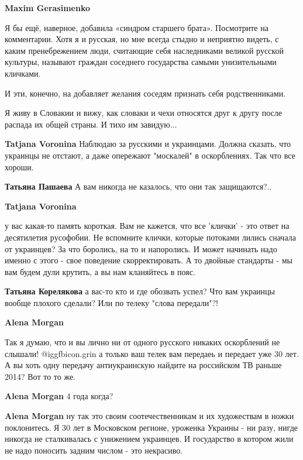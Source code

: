 \begin{itemize}
\begin{itemize}
\textbf{Maxim Gerasimenko}

Я бы ещё, наверное, добавила «синдром старшего брата». Посмотрите на
комментарии. Хотя я и русская, но мне всегда стыдно и неприятно видеть, с каким
пренебрежением люди, считающие себя наследниками великой русской культуры,
называют граждан соседнего государства самыми унизительными кличками.

И эти, конечно, на добавляет желания соседям признать себя родственниками.

Я живу в Словакии и вижу, как словаки и чехи относятся друг к другу после
распада их общей страны. И тихо им завидую...


\textbf{Tatjana Voronina} Наблюдаю за русскими и украинцами. Должна сказать, что украинцы не отстают, а даже опережают "москалей" в оскорблениях. Так что все хороши.

\textbf{Татьяна Пашаева}
А вам никогда не казалось, что они так защищаются?..


\textbf{Tatjana Voronina} 

у вас какая-то память короткая. Вам не кажется, что все 'клички' - это ответ на
десятилетия русофобии. Не вспомните клички, которые потоками лились сначала от
украинцев? За что боролись, на то и напоролись. И может начинать надо именно с
этого - свое поведение скорректировать. А то двойные стандарты - мы вам будем
дули крутить, а вы нам кланяйтесь в пояс.

\textbf{Татьяна Корелякова} а вас-то кто и где обозвать успел? Что вам украинцы вообще плохого сделали? Или по телеку "слова передали"?!

\textbf{Alena Morgan} 

Так я думаю, что и вы лично ни от одного русского никаких оскорблений не
слышали!  @igg{fbicon.grin}  а только ваш телек вам передаеь и передает уже 30 лет. А вы хоть
одну передачу антиукраинскую найдите на российском ТВ раньше 2014? Вот то то
же.

\textbf{Alena Morgan} 4 года когда?

\textbf{Alena Morgan} ну так это своим соотечественникам и их художествам в ножки
поклонитесь. Я 30 лет в Московском регионе, уроженка Украины - ни разу, нигде
никогда не сталкивалась с унижением украинцев. И государство в котором жили не
надо поносить задним числом - это некрасиво.


\end{itemize}
\end{itemize}

